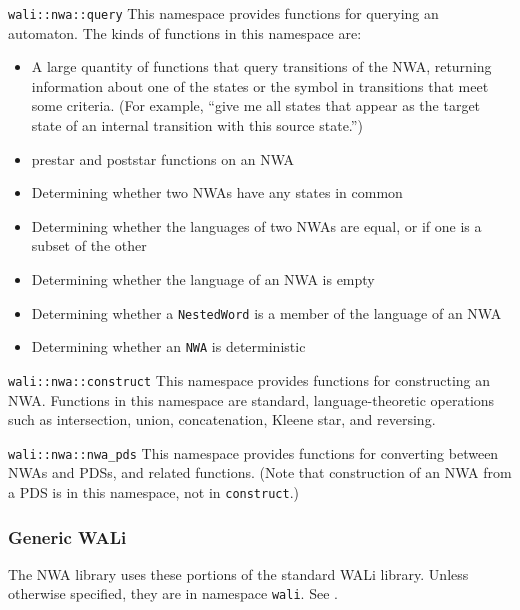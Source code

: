 \begin{description}
  \item\texttt{wali::nwa::query} This namespace provides functions for
    querying an automaton. The kinds of functions in this namespace are:
    \begin{itemize}
      \item A large quantity of functions that query transitions of
        the NWA, returning information about one of the states or the symbol
        in transitions that meet some criteria. (For example, ``give me all
        states that appear as the target state of an internal transition with
        this source state.'')
      \item prestar and poststar functions on an NWA
      \item Determining whether two NWAs have any states in common
      \item Determining whether the languages of two NWAs are equal, or if
        one is a subset of the other
      \item Determining whether the language of an NWA is empty
      \item Determining whether a \texttt{NestedWord} is a member of the
        language of an NWA
      \item Determining whether an \texttt{NWA} is deterministic
    \end{itemize}
  \item\texttt{wali::nwa::construct} This namespace provides functions for
    constructing an NWA. Functions in this namespace are standard,
    language-theoretic operations such as intersection, union, concatenation,
    Kleene star, and reversing.
  \item\texttt{wali::nwa::nwa\_pds} This namespace provides functions for
    converting between NWAs and PDSs, and related functions. (Note that
    construction of an NWA from a PDS is in this namespace, not in
    \texttt{construct}.)
\end{description}


\subsubsection{Generic WALi}

The NWA library uses these portions of the standard WALi library. Unless
otherwise specified, they are in namespace \texttt{wali}. See \cite{wali}.

